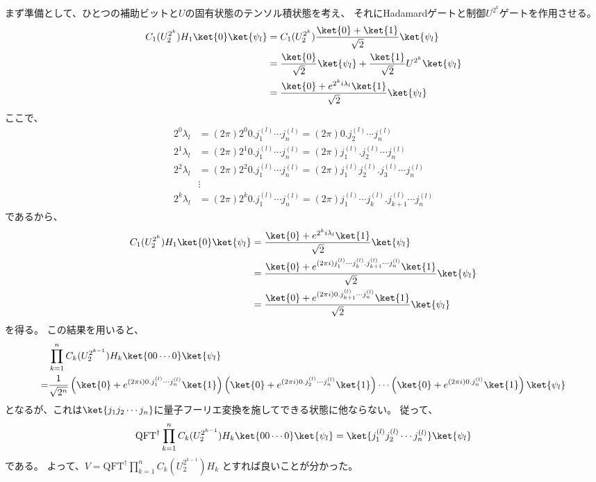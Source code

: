 \documentclass[]{ltjsarticle}
\begin{document}
まず準備として、ひとつの補助ビットと$U$の固有状態のテンソル積状態を考え、
それにHadamardゲートと制御$U^{2^k}$ゲートを作用させる。
\begin{align}
    C_1(U^{2^{k}}_{2}) H_1 \ket{0}\ket{\psi_l}
    &=
    C_1(U^{2^{k}}_{2}) 
    \frac{\ket{0} + \ket{1}}{\sqrt{2}}
    \ket{\psi_l} \\
    &=
    \frac{\ket{0}}{\sqrt{2}}
    \ket{\psi_l}
    +
    \frac{\ket{1}}{\sqrt{2}} 
    U^{2^{k}}\ket{\psi_l} \\
    &=
    \frac{\ket{0} + e^{2^ki\lambda_l} \ket{1}}{\sqrt{2}}
    \ket{\psi_l}
\end{align}
ここで、
\begin{align}
    2^0 \lambda_l 
    &=
    (2\pi) 2^0 0.j_1^{(l)} \cdots j_n^{(l)}
    =
    (2\pi) 0.j_2^{(l)} \cdots j_n^{(l)} \\
    2^1 \lambda_l 
    &=
    (2\pi) 2^1 0.j_1^{(l)} \cdots j_n^{(l)}
    =
    (2\pi) j_1^{(l)}.j_2^{(l)} \cdots j_n^{(l)} \\
    2^2 \lambda_l 
    &=
    (2\pi) 2^2 0.j_1^{(l)} \cdots j_n^{(l)}
    =
    (2\pi) j_1^{(l)}j_2^{(l)}.j_3^{(l)} \cdots j_n^{(l)} \\
    &\vdots \\
    2^k \lambda_l 
    &=
    (2\pi) 2^k 0.j_1^{(l)} \cdots j_n^{(l)}
    =
    (2\pi) j_1^{(l)} \cdots j_k^{(l)}.j_{k+1}^{(l)} \cdots j_n^{(l)}
\end{align}
であるから、
\begin{align}
    C_1(U^{2^{k}}_{2}) H_1 \ket{0}\ket{\psi_l}
    &=
    \frac{\ket{0} + e^{2^ki\lambda_l} \ket{1}}{\sqrt{2}}
    \ket{\psi_l} \\
    &=
    \frac{\ket{0} + e^{(2\pi i) j_1^{(l)} \cdots j_k^{(l)}.j_{k+1}^{(l)} \cdots j_n^{(l)}} \ket{1}}{\sqrt{2}}
    \ket{\psi_l} \\
    &=
    \frac{\ket{0} + e^{(2\pi i) 0.j_{k+1}^{(l)} \cdots j_n^{(l)}} \ket{1}}{\sqrt{2}}
    \ket{\psi_l}
\end{align}
を得る。
この結果を用いると、
\begin{align}
    &\prod_{k=1}^n C_k(U^{2^{k-1}}_{2}) H_k \ket{00\cdots 0}\ket{\psi_l} \\
    =
    &\frac{1}{\sqrt{2^n}}
    \left(
        \ket{0} + e^{(2\pi i) 0.j_{1}^{(l)} \cdots j_n^{(l)}} \ket{1}
    \right)
    \left(
        \ket{0} + e^{(2\pi i) 0.j_{2}^{(l)} \cdots j_n^{(l)}} \ket{1}
    \right)
    \cdots 
    \left(
        \ket{0} + e^{(2\pi i) 0.j_n^{(l)}} \ket{1}
    \right)
    \ket{\psi_l}
\end{align}
となるが、これは$\ket{j_1j_2 \cdots j_n}$に量子フーリエ変換を施してできる状態に他ならない。
従って、
\begin{align}
    \mathrm{QFT}^{\dagger }\prod_{k=1}^n C_k(U^{2^{k-1}}_{2}) H_k \ket{00\cdots 0}\ket{\psi_l} 
    =
    \ket{j_1^{(l)}j_2^{(l)} \cdots j_n^{(l)}}\ket{\psi_l}
\end{align}
である。
よって、$V = \mathrm{QFT}^{\dagger }\prod_{k=1}^n C_k(U^{2^{k-1}}_{2}) H_k$
とすれば良いことが分かった。
\end{document}
